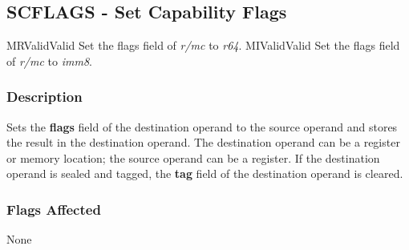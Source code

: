 \clearpage
{}
{}
\subsection*{SCFLAGS - Set Capability Flags}

\begin{x86opcodetable}
  {MR}{Valid}{Valid}
  {Set the flags field of \emph{r/mc} to \emph{r64}.}
  {MI}{Valid}{Valid}
  {Set the flags field of \emph{r/mc} to \emph{imm8}.}
\end{x86opcodetable}

\begin{x86opentable}
\end{x86opentable}

\subsubsection*{Description}

Sets the \textbf{flags} field of the destination operand to the
source operand and stores the result in the destination operand.  The
destination operand can be a register or memory location; the source
operand can be a register.  If the destination operand is sealed and
tagged, the \textbf{tag} field of the destination operand is cleared.

\subsubsection*{Flags Affected}

None
